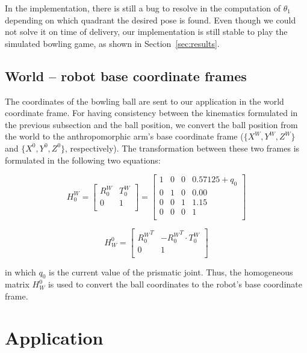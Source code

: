\documentclass[10pt,a4paper,notitlepage,twocolumn,twoside]{article}
\begin{document}
In the implementation, there is still a bug to resolve in the computation of $\theta_1$ depending on which quadrant the desired pose is found. Even though we could not solve it on time of delivery, our implementation is still stable to play the simulated bowling game, as shown in Section~\ref{sec:results}.

\subsection{World -- robot base coordinate frames}

The coordinates of the bowling ball are sent to our application in the world coordinate frame. For having consistency between the kinematics formulated in the previous subsection and the ball position, we convert the ball position from the world to the anthropomorphic arm's base coordinate frame ($\{X^W,Y^W,Z^W\}$ and $\{X^0,Y^0,Z^0\}$, respectively). The transformation between these two frames is formulated in the following two equations:

\begin{equation}
H_0^W = \begin{bmatrix}
R_0^W & T_0^W\\
0 & 1\\
\end{bmatrix} =
\begin{bmatrix}
1 & 0 & 0 & 0.57125 + q_0\\
0 & 1 & 0 & 0.00\\
0 & 0 & 1 & 1.15\\
0 & 0 & 0 & 1\\
\end{bmatrix}
\end{equation}

\begin{equation}
H_W^0 = \begin{bmatrix}
{R_0^W}^T & -{R_0^W}^T \cdot T_0^W\\
0 & 1\\
\end{bmatrix}
\end{equation}

\noindent in which $q_0$ is the current value of the prismatic joint. Thus, the homogeneous matrix $H_W^0$ is used to convert the ball coordinates to the robot's base coordinate frame.

\section{Application}
\label{sec:app}
\end{document}
